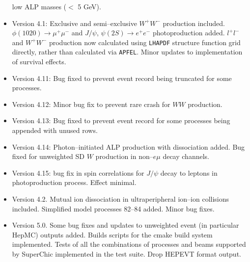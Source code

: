 \documentclass[12pt]{article}
\begin{document}
\begin{itemize}
low ALP masses ($<$ 5 GeV).
\item Version 4.1: Exclusive and semi--exclusive $W^+ W^-$ production included.  $\phi(1020)\to \mu^+ \mu^-$ and $J/\psi$, $\psi(2S) \to e^+ e^-$ 
photoproduction added. $l^+ l^-$ and $W^+ W^-$ production now calculated using \texttt{LHAPDF} structure function grid directly, rather than calculated 
via \texttt{APFEL}. Minor updates to implementation of survival effects.
\item Version 4.11: Bug fixed to prevent event record being truncated for some processes.
\item Version 4.12: Minor bug fix to prevent rare crash for $WW$ production.
\item Version 4.13: Bug fixed to prevent event record for some processes being appended with unused rows.
\item Version 4.14: Photon--initiated ALP production with dissociation added. Bug fixed for unweighted SD $W$ production in non--$e\mu$ decay channels.
\item Version 4.15: bug fix in spin correlations for $J/\psi$ decay to leptons in photoproduction process. Effect minimal.
\item Version 4.2. Mutual ion dissociation in ultraperipheral ion--ion collisions included. Simplified model processes 82--84 added. Minor bug fixes.
\item Version 5.0. Some bug fixes and updates to unweighted event (in particular HepMC) outputs  added. Builds scripts for the cmake build system  implemented.
 Tests of all the combinations of  processes and beams supported by SuperChic  implemented in the test suite. Drop HEPEVT format output.

\end{itemize}


%
{}

\end{document}
